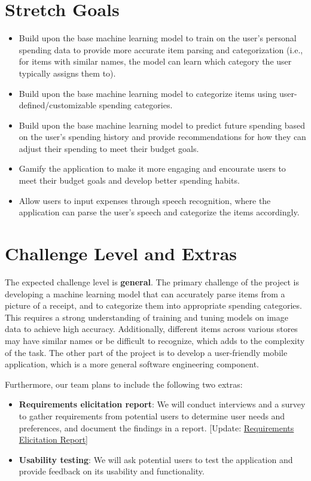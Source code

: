 \documentclass{article}
\begin{document}
\section{Stretch Goals}
\begin{itemize}
    \item Build upon the base machine learning model to train on the user's
    personal spending data to provide more accurate item parsing and
    categorization (i.e., for items with similar names, the model can learn
    which category the user typically assigns them to).
    \item Build upon the base machine learning model to categorize items using
    user-defined/customizable spending categories.
    \item Build upon the base machine learning model to predict future spending
    based on the user's spending history and provide recommendations for how
    they can adjust their spending to meet their budget goals.
    \item Gamify the application to make it more engaging and encourate users to
    meet their budget goals and develop better spending habits.
    \item Allow users to input expenses through speech recognition, where the
    application can parse the user's speech and categorize the items
    accordingly.
\end{itemize}

\section{Challenge Level and Extras}

The expected challenge level is \textbf{general}. The primary challenge of the
project is developing a machine learning model that can accurately parse items
from a picture of a receipt, and to categorize them into appropriate spending
categories. This requires a strong understanding of training and tuning models
on image data to achieve high accuracy. Additionally, different items across
various stores may have similar names or be difficult to recognize, which adds
to the complexity of the task. The other part of the project is to develop a
user-friendly mobile application, which is a more general software engineering
component.

Furthermore, our team plans to include the following two extras:
\begin{itemize}
    \item \textbf{Requirements elicitation report}: We will conduct interviews
    and a survey to gather requirements from potential users to determine user
    needs and preferences, and document the findings in a report. [Update:
    \href{https://github.com/PlutosCapstone/Plutos/tree/main/docs/Extras/RequirementsElicitationReport.pdf}{Requirements
    Elicitation Report}]
    \item \textbf{Usability testing}: We will ask potential users to test the
    application and provide feedback on its usability and functionality.

\end{itemize}
\end{document}
